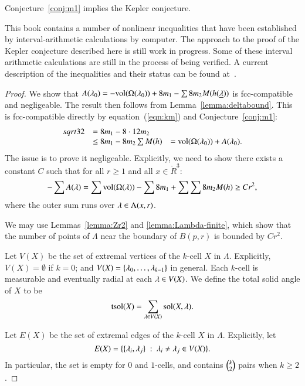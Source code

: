 \begin{theorem}\label{theorem:mk1}
Conjecture~\ref{conj:m1} implies the Kepler conjecture.
\end{theorem}

\begin{note}%
This book contains a number of nonlinear inequalities that have been established by interval-arithmetic calculations by computer.  The approach to the proof of the Kepler conjecture described here is still work in progress.  Some of these interval arithmetic calculations are still in the process of being verified.  A current description of the inequalities and their status can be found at~\cite{hales:2009:nonlinear}.
\end{note}

\begin{proof} 
We show that $A(\lambda_0)  = -{\operatorname{vol}}(\Omega(\lambda_0)) + 8 m_1 - \sum 8 m_2 M(h({\underline{\lambda}}))$ is fcc-compatible and negligeable.  The
result then follows from Lemma~\ref{lemma:deltabound}.  
This is fcc-compatible directly
by equation~(\ref{eqn:km})
and Conjecture~\ref{conj:m1}:
$$
\begin{array}{lll}
sqrt{32} &= 8 m_1 - 8\cdot 12 m_2\\
  &\le 8 m_1 - 8 m_2 \sum M(h)
  &= {\operatorname{vol}}(\Omega(\lambda_0)) + A(\lambda_0).
\end{array}
$$  
The issue is to prove it negligeable.  Explicitly, we need
to show there exists a constant  $C$ such that for all $r\ge 1$ and all $x\in\ring{R}^3$:
\begin{equation}\label{eqn:neg}
  -\sum A(\lambda) = \sum {\operatorname{vol}}(\Omega(\lambda)) -\sum 8m_1 + \sum \sum 8 m_2 M(h) \ge C r^2,
\end{equation}
where the outer sum runs over $\lambda\in \Lambda(x,r)$.

We may use Lemmas~\ref{lemma:Zr2} and \ref{lemma:Lambda-finite}, which show that the number of points of $\Lambda$ near the boundary of $B(p,r)$ is bounded by $C r^2$.

Let $V(X)$ be the set of extremal vertices of the $k$-cell $X$ in $\Lambda$.  Explicitly, $V(X)=\emptyset$ if $k=0$; and $V(X) = \{\lambda_0,\ldots,\lambda_{k-1}\}$ in general.  Each $k$-cell is measurable and eventually
radial at each $\lambda\in V(X)$.  We define the total solid angle of $X$ to be
$$
{\operatorname{tsol}}(X) = \sum_{\lambda\in V(X)} \operatorname{sol}(X,\lambda).
$$

Let $E(X)$ be the set of extremal edges of the $k$-cell $X$ in $\Lambda$.  Explicitly, let 
$$E(X)=\{\{\lambda_i,\lambda_j\}\ :\  \lambda_i\ne\lambda_j\in V(X)\}.$$
In particular, the set is empty for $0$ and $1$-cells, and contains
$\tbinom{k}{2}$ pairs when $k\ge 2$.



\end{proof}
